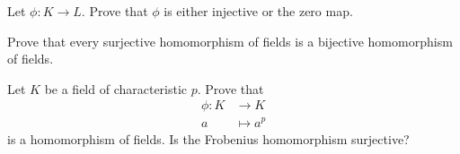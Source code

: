 \documentclass{ximera}
\begin{document}
\begin{exercise}
  Let $\phi:K\to L$. Prove that $\phi$ is either injective or the zero
  map.
\end{exercise}

\begin{exercise}
  Prove that every surjective homomorphism of fields is a bijective
  homomorphism of fields.
\end{exercise}



\begin{example}
  Let $K$ be a field of characteristic $p$. Prove that
  \begin{align*}
    \phi:K &\to K\\
    a &\mapsto a^p
  \end{align*}
  is a homomorphism of fields. Is the Frobenius homomorphism surjective?
\end{example}
\end{document}
